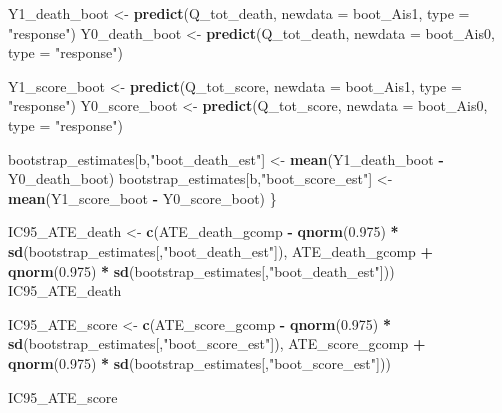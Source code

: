 \documentclass[
]{book}
\newenvironment{Shaded}{\begin{snugshade}}{\end{snugshade}}
\newcommand{\AttributeTok}[1]{\textcolor[rgb]{0.13,0.29,0.53}{#1}}
\newcommand{\FloatTok}[1]{\textcolor[rgb]{0.00,0.00,0.81}{#1}}
\newcommand{\FunctionTok}[1]{\textcolor[rgb]{0.13,0.29,0.53}{\textbf{#1}}}
\newcommand{\NormalTok}[1]{#1}
\newcommand{\OtherTok}[1]{\textcolor[rgb]{0.56,0.35,0.01}{#1}}
\newcommand{\SpecialCharTok}[1]{\textcolor[rgb]{0.81,0.36,0.00}{\textbf{#1}}}
\newcommand{\StringTok}[1]{\textcolor[rgb]{0.31,0.60,0.02}{#1}}
\begin{document}
\begin{Shaded}
\begin{Highlighting}[]
\NormalTok{  Y1\_death\_boot }\OtherTok{\textless{}{-}} \FunctionTok{predict}\NormalTok{(Q\_tot\_death, }\AttributeTok{newdata =}\NormalTok{ boot\_Ais1, }\AttributeTok{type =} \StringTok{"response"}\NormalTok{)}
\NormalTok{  Y0\_death\_boot }\OtherTok{\textless{}{-}} \FunctionTok{predict}\NormalTok{(Q\_tot\_death, }\AttributeTok{newdata =}\NormalTok{ boot\_Ais0, }\AttributeTok{type =} \StringTok{"response"}\NormalTok{)}

\NormalTok{  Y1\_score\_boot }\OtherTok{\textless{}{-}} \FunctionTok{predict}\NormalTok{(Q\_tot\_score, }\AttributeTok{newdata =}\NormalTok{ boot\_Ais1, }\AttributeTok{type =} \StringTok{"response"}\NormalTok{)}
\NormalTok{  Y0\_score\_boot }\OtherTok{\textless{}{-}} \FunctionTok{predict}\NormalTok{(Q\_tot\_score, }\AttributeTok{newdata =}\NormalTok{ boot\_Ais0, }\AttributeTok{type =} \StringTok{"response"}\NormalTok{)}

\NormalTok{  bootstrap\_estimates[b,}\StringTok{"boot\_death\_est"}\NormalTok{] }\OtherTok{\textless{}{-}} \FunctionTok{mean}\NormalTok{(Y1\_death\_boot }\SpecialCharTok{{-}}\NormalTok{ Y0\_death\_boot)}
\NormalTok{  bootstrap\_estimates[b,}\StringTok{"boot\_score\_est"}\NormalTok{] }\OtherTok{\textless{}{-}} \FunctionTok{mean}\NormalTok{(Y1\_score\_boot }\SpecialCharTok{{-}}\NormalTok{ Y0\_score\_boot)}
\NormalTok{\}}

\NormalTok{IC95\_ATE\_death }\OtherTok{\textless{}{-}} \FunctionTok{c}\NormalTok{(ATE\_death\_gcomp }\SpecialCharTok{{-}} 
                      \FunctionTok{qnorm}\NormalTok{(}\FloatTok{0.975}\NormalTok{) }\SpecialCharTok{*} \FunctionTok{sd}\NormalTok{(bootstrap\_estimates[,}\StringTok{"boot\_death\_est"}\NormalTok{]),}
\NormalTok{                    ATE\_death\_gcomp }\SpecialCharTok{+} 
                      \FunctionTok{qnorm}\NormalTok{(}\FloatTok{0.975}\NormalTok{) }\SpecialCharTok{*} \FunctionTok{sd}\NormalTok{(bootstrap\_estimates[,}\StringTok{"boot\_death\_est"}\NormalTok{]))}
\NormalTok{IC95\_ATE\_death}

\NormalTok{IC95\_ATE\_score }\OtherTok{\textless{}{-}} \FunctionTok{c}\NormalTok{(ATE\_score\_gcomp }\SpecialCharTok{{-}} 
                      \FunctionTok{qnorm}\NormalTok{(}\FloatTok{0.975}\NormalTok{) }\SpecialCharTok{*} \FunctionTok{sd}\NormalTok{(bootstrap\_estimates[,}\StringTok{"boot\_score\_est"}\NormalTok{]),}
\NormalTok{                    ATE\_score\_gcomp }\SpecialCharTok{+} 
                      \FunctionTok{qnorm}\NormalTok{(}\FloatTok{0.975}\NormalTok{) }\SpecialCharTok{*} \FunctionTok{sd}\NormalTok{(bootstrap\_estimates[,}\StringTok{"boot\_score\_est"}\NormalTok{]))}
                    
\NormalTok{IC95\_ATE\_score}
\end{Highlighting}
\end{Shaded}
\end{document}
